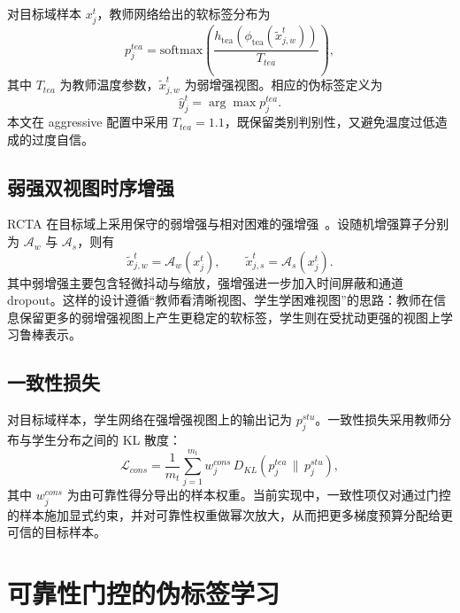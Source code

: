 对目标域样本 $x_j^t$，教师网络给出的软标签分布为
\begin{equation}
p_{j}^{tea}=
\mathrm{softmax}\!\left(
\frac{h_{\mathrm{tea}}(\phi_{\mathrm{tea}}(\tilde{x}_{j,w}^t))}{T_{tea}}
\right),
\end{equation}
其中 $T_{tea}$ 为教师温度参数，$\tilde{x}_{j,w}^t$ 为弱增强视图。相应的伪标签定义为
\begin{equation}
\hat{y}_j^t=\arg\max p_j^{tea}.
\end{equation}
本文在 aggressive 配置中采用 $T_{tea}=1.1$，既保留类别判别性，又避免温度过低造成的过度自信。

\subsection{弱强双视图时序增强}
RCTA 在目标域上采用保守的弱增强与相对困难的强增强~\cite{xie2020uda}。设随机增强算子分别为 $\mathcal{A}_w$ 与 $\mathcal{A}_s$，则有
\begin{equation}
\tilde{x}_{j,w}^t=\mathcal{A}_w(x_j^t),\qquad
\tilde{x}_{j,s}^t=\mathcal{A}_s(x_j^t).
\end{equation}
其中弱增强主要包含轻微抖动与缩放，强增强进一步加入时间屏蔽和通道 dropout。这样的设计遵循“教师看清晰视图、学生学困难视图”的思路：教师在信息保留更多的弱增强视图上产生更稳定的软标签，学生则在受扰动更强的视图上学习鲁棒表示。

\subsection{一致性损失}
对目标域样本，学生网络在强增强视图上的输出记为 $p_j^{stu}$。一致性损失采用教师分布与学生分布之间的 KL 散度：
\begin{equation}
\mathcal{L}_{cons}=
\frac{1}{m_t}\sum_{j=1}^{m_t}
w_j^{cons}\,
D_{KL}\!\left(p_j^{tea}\,\|\,p_j^{stu}\right),
\end{equation}
其中 $w_j^{cons}$ 为由可靠性得分导出的样本权重。当前实现中，一致性项仅对通过门控的样本施加显式约束，并对可靠性权重做幂次放大，从而把更多梯度预算分配给更可信的目标样本。

\section{可靠性门控的伪标签学习}
